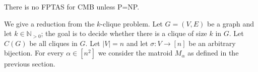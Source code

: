 {%



\begin{lemma}
	\label{lem:KCM2}
	There is no \textnormal{FPTAS} for \textnormal{CMB} unless \textnormal{P=NP}.%
\end{lemma}


We give a reduction from the $k$-clique problem. Let $G = (V,E)$ be a graph and let $k \in \mathbb{N}_{>0}$; the goal is to decide whether there is a clique of size $k$ in $G$. Let $C(G)$ be all cliques in $G$. Let $|V| = n$ and let $\sigma : V \rightarrow [n]$ be an arbitrary bijection. For every $\alpha \in [n^2]$ we consider the matroid $M_{\alpha}$ as defined in the previous section. 

}
